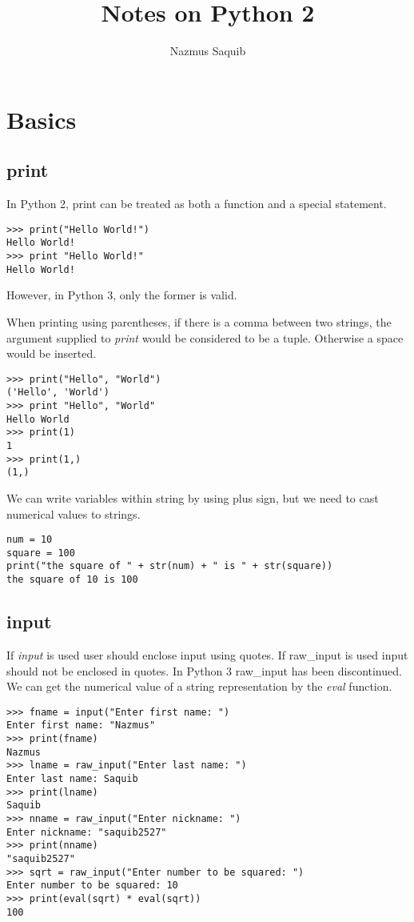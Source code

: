 \documentclass[a4paper, 12pt]{article}
\begin{document}
\title{Notes on Python 2}
\author{Nazmus Saquib}

\maketitle

\section{Basics}

\subsection{print}
In Python 2, print can be treated as both a function and a special statement.
\begin{verbatim}
>>> print("Hello World!")
Hello World!
>>> print "Hello World!"
Hello World!
\end{verbatim}
However, in Python 3, only the former is valid.

When printing using parentheses, if there is a comma between two strings, the argument supplied to \emph{print} would be considered to be a tuple. Otherwise a space would be inserted.
\begin{verbatim}
>>> print("Hello", "World")
('Hello', 'World')
>>> print "Hello", "World"
Hello World
>>> print(1)
1
>>> print(1,)
(1,)
\end{verbatim}

We can write variables within string by using plus sign, but we need to cast numerical values to strings.
\begin{verbatim}
num = 10
square = 100
print("the square of " + str(num) + " is " + str(square))
the square of 10 is 100
\end{verbatim}


\subsection{input}
If \emph{input} is used user should enclose input using quotes. If raw\_input is used input should not be enclosed in quotes.
In Python 3 raw\_input has been discontinued. We can get the numerical value of a string representation by the \emph{eval} function.
\begin{verbatim}
>>> fname = input("Enter first name: ")
Enter first name: "Nazmus"
>>> print(fname)
Nazmus
>>> lname = raw_input("Enter last name: ")
Enter last name: Saquib
>>> print(lname)
Saquib
>>> nname = raw_input("Enter nickname: ")
Enter nickname: "saquib2527"
>>> print(nname)
"saquib2527"
>>> sqrt = raw_input("Enter number to be squared: ")
Enter number to be squared: 10
>>> print(eval(sqrt) * eval(sqrt))
100
\end{verbatim}
\end{document}
